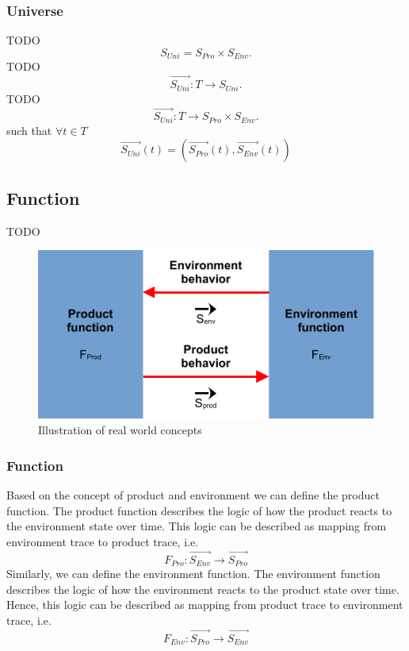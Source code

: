 \documentclass[conference]{IEEEtran}
\begin{document}
    \subsubsection{Universe}
    TODO
    \[
        S_{Uni} = S_{Pro} \times S_{Env}.
    \]
    TODO
    \[
        \overrightarrow{S_{Uni}}: T \rightarrow S_{Uni}.
    \]
    TODO
    \[
        \overrightarrow{S_{Uni}}: T \rightarrow S_{Pro} \times S_{Env}.
    \]
    such that $\forall t \in T$
    \[
        \overrightarrow{S_{Uni}}(t) = (\overrightarrow{S_{Pro}}(t), \overrightarrow{S_{Env}}(t))
    \]

    \subsection{Function}
    TODO

    \begin{figure}[htbp]
        \centering
        \includegraphics{./figures/theory-world.pdf}
        \caption{Illustration of real world concepts}
        \label{figure:theory-function}
    \end{figure}
    
    \subsubsection{Function}
    Based on the concept of product and environment we can define the product function.
    The product function describes the logic of how the product reacts to the environment state over time.
    This logic can be described as mapping from environment trace to product trace, i.e.
    \[
        F_{Pro}: \overrightarrow{S_{Env}} \rightarrow \overrightarrow{S_{Pro}}
    \]
    Similarly, we can define the environment function.
    The environment function describes the logic of how the environment reacts to the product state over time.
    Hence, this logic can be described as mapping from product trace to environment trace, i.e.
    \[
        F_{Env}: \overrightarrow{S_{Pro}} \rightarrow \overrightarrow{S_{Env}}
    \]
\end{document}
